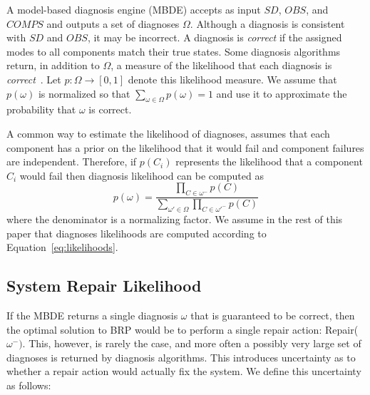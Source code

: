 A model-based diagnosis engine (MBDE) accepts as input $SD$, $OBS$, and $COMPS$ and outputs a set of diagnoses $\Omega$. Although a diagnosis is consistent with $SD$ and $OBS$, it may be incorrect. A diagnosis is {\em correct} if the assigned modes to all components match their true states. Some diagnosis algorithms return, in addition to $\Omega$, a measure of the likelihood that each diagnosis is {\em correct}~\cite{williams2007conflict,abreu2011simultaneousDebugging}. Let $p: \Omega \rightarrow [0,1]$ denote this likelihood measure. We assume that $p(\omega)$ is normalized so that $\sum_{\omega\in\Omega} p(\omega)=1$ and use it to approximate the probability that $\omega$ is correct.


A common way to estimate the likelihood of diagnoses, assumes that each component has a prior on the likelihood that it would fail and component failures are independent. Therefore, if $p(C_i)$ represents the likelihood that a component $C_i$ would fail then diagnosis likelihood can be computed as
\begin{equation}
\displaystyle p(\omega)=\frac{\prod_{C\in\omega^{-}} p(C)}{\sum_{\omega'\in\Omega}{\prod_{C\in\omega'^{-}} p(C)}}
\label{eq:likelihoods}
\end{equation}
where the denominator is a normalizing factor. %
We assume in the rest of this paper that diagnoses likelihoods are computed according to Equation~\ref{eq:likelihoods}.



\subsection{System Repair Likelihood}
If the MBDE returns a single diagnosis $\omega$ that is guaranteed to be correct, then the optimal solution to BRP would be to perform a single repair action: Repair($\omega^{-})$. %
This, however, is rarely the case, and more often a possibly very large set of diagnoses is returned by diagnosis algorithms. This introduces uncertainty as to whether a repair action would actually fix the system. We define this uncertainty as follows:

